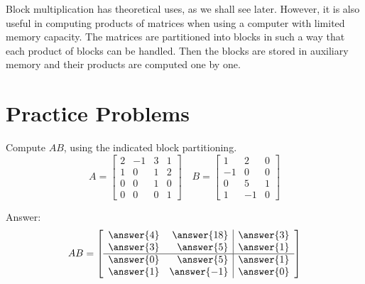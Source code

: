 \documentclass{ximera}
\begin{document}
Block multiplication has theoretical uses, as we shall see later. However, it is also useful in computing products of matrices when using a computer with limited memory capacity. The matrices are partitioned into blocks in such a way that each product of blocks can be handled. Then the blocks are stored in auxiliary memory and their products are computed one by one.

\section*{Practice Problems}

\begin{problem}\label{prob:blockmatmult1}
Compute $AB$, using the indicated block partitioning.
\begin{equation*}
A = \left[ \begin{array}{rr|rr}
2 & -1 & 3 & 1 \\
1 & 0  & 1 & 2 \\
\hline
0 & 0 & 1 & 0 \\
0 & 0 & 0 & 1
\end{array} \right] \quad
B = \left[ \begin{array}{rr|r}
1 & 2 & 0 \\
-1 & 0  & 0 \\
\hline
0 & 5 & 1 \\
1 & -1 & 0 
\end{array} \right]
\end{equation*}

Answer:
\begin{equation*}
AB = \left[ \begin{array}{rr|r}
\answer{4} & \answer{18} & \answer{3} \\
\answer{3} & \answer{5}  & \answer{1} \\
\hline
\answer{0} & \answer{5} & \answer{1} \\
\answer{1} & \answer{-1} & \answer{0}
\end{array} \right] 
\end{equation*}

\end{problem}
\end{document}
